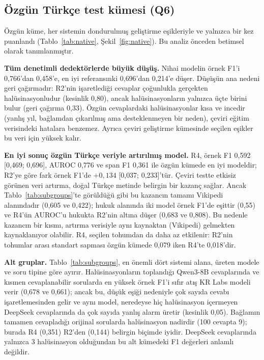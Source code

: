 \documentclass[conference,a4paper]{IEEEtran}
\begin{document}
\subsection{Özgün Türkçe test kümesi (Q6)}
Özgün küme, her sistemin dondurulmuş geliştirme eşikleriyle ve yalnızca bir kez puanlandı (Tablo~\ref{tab:native}, Şekil~\ref{fig:native}). Bu analiz önceden betimsel olarak tanımlanmıştır.

\textbf{Tüm denetimli dedektörlerde büyük düşüş.} Nihai modelin örnek F1'i 0{,}766'dan 0{,}458'e, en iyi referansınki 0{,}696'dan 0{,}214'e düşer. Düşüşün ana nedeni geri çağırmadır: R2'nin işaretlediği cevaplar çoğunlukla gerçekten halüsinasyonludur (kesinlik 0{,}80), ancak halüsinasyonların yalnızca üçte birini bulur (geri çağırma 0{,}33). Özgün cevaplardaki halüsinasyonlar kısa ve incedir (yanlış yıl, bağlamdan çıkarılmış ama desteklenmeyen bir neden), çeviri eğitim verisindeki hatalara benzemez. Ayrıca çeviri geliştirme kümesinde seçilen eşikler bu veri için yüksek kalır.

\textbf{En iyi sonuç özgün Türkçe veriyle artırılmış model.} R4, örnek F1 0{,}592 [0{,}469; 0{,}696], AUROC 0{,}776 ve span F1 0{,}361 ile özgün kümede en iyi modeldir; R2'ye göre fark örnek F1'de $+0{,}134$ [0{,}037; 0{,}233]'tür. Çeviri testte etkisiz görünen veri artırma, doğal Türkçe metinde belirgin bir kazanç sağlar. Ancak Tablo~\ref{tab:subgroups}'te görüldüğü gibi bu kazancın tamamı Vikipedi alanındadır (0{,}605 ve 0{,}422); hukuk alanında iki model örnek F1'de eşittir (0{,}55) ve R4'ün AUROC'u hukukta R2'nin altına düşer (0{,}683 ve 0{,}808). Bu nedenle kazancın bir kısmı, artırma verisiyle aynı kaynaktan (Vikipedi) gelmekten kaynaklanıyor olabilir. R4, seçilen tohumdan da daha az etkilenir: R2'nin tohumlar arası standart sapması özgün kümede 0{,}079 iken R4'te 0{,}018'dir.

\textbf{Alt gruplar.} Tablo~\ref{tab:subgroups}, en önemli dört sistemi alana, üreten modele ve soru tipine göre ayırır. Halüsinasyonların toplandığı Qwen3-8B cevaplarında ve kısmen cevaplanabilir sorularda en yüksek örnek F1'i sıfır atış KR Labs modeli verir (0{,}678 ve 0{,}661); ancak bu, düşük eşiği nedeniyle çok sayıda cevabı işaretlemesinden gelir ve aynı model, neredeyse hiç halüsinasyon içermeyen DeepSeek cevaplarında da çok sayıda yanlış alarm üretir (kesinlik 0{,}05). Bağlamın tamamen cevapladığı orijinal sorularda halüsinasyon nadirdir (100 cevapta 9); burada R4 (0{,}351) R2'den (0{,}144) belirgin biçimde iyidir. DeepSeek cevaplarında yalnızca 3 halüsinasyon olduğundan bu alt kümedeki F1 değerleri anlamlı değildir.
\end{document}

